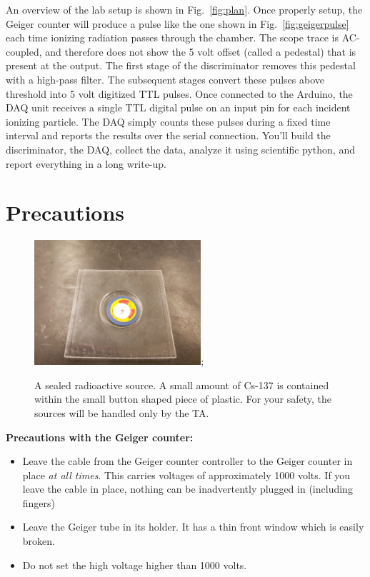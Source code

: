 \documentclass[12pt]{article}
\begin{document}
An overview of the lab setup is shown in Fig.~\ref{fig:plan}.  Once
properly setup, the Geiger counter will produce a pulse like the one
shown in Fig.~\ref{fig:geigerpulse} each time ionizing radiation
passes through the chamber.  The scope trace is AC-coupled, and
therefore does not show the 5 volt offset (called a pedestal) that is
present at the output.  The first stage of the discriminator removes
this pedestal with a high-pass filter.  The subsequent stages convert
these pulses above threshold into 5 volt digitized TTL pulses.  Once
connected to the Arduino, the DAQ unit receives a single TTL digital
pulse on an input pin for each incident ionizing particle.  The DAQ
simply counts these pulses during a fixed time interval and reports
the results over the serial connection.  You'll build the
discriminator, the DAQ, collect the data, analyze it using scientific
python, and report everything in a long write-up.

\section{Precautions}

\begin{figure}[htbp]
\begin{center}
 \includegraphics[width=0.55\textwidth]{figs/source.jpg};
\caption{\label{fig:source} A sealed radioactive source.  A small amount of Cs-137 is contained within the small button shaped piece of plastic.  For your safety, the sources will be handled only by the TA.}
\end{center}
\end{figure}

\noindent
{\bf Precautions with the Geiger counter:}
\begin{itemize}
\item Leave the cable from the Geiger counter controller to the Geiger counter in place {\em at all times}.  This carries voltages of approximately 1000 volts.  If you leave the cable in place, nothing can be inadvertently plugged in (including fingers)
\item Leave the Geiger tube in its holder.  It has a thin front window which is easily broken.
\item Do not set the high voltage higher than 1000 volts.
\end{itemize}
\end{document}
